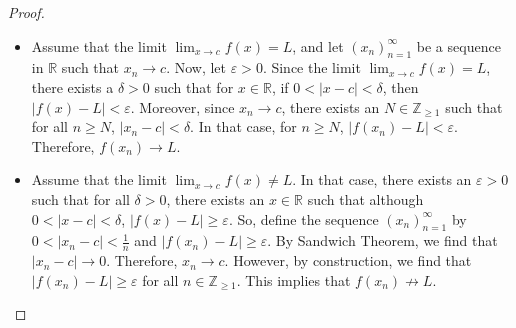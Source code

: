 \documentclass[a4paper, openany]{memoir}
\theoremstyle{definition}
\theoremstyle{plain}
\begin{document}
\begin{proof}
\hspace*{0pt}
\begin{itemize}
    \item Assume that the limit $\lim_{x \to c} f(x) = L$, and let  $(x_n)_{n=1}^{\infty}$ be a sequence in $\mathbb{R}$ such that $x_n \to c$. Now, let $\varepsilon > 0$. Since the limit $\lim_{x \to c} f(x) = L$, there exists a $\delta > 0$ such that for $x \in \mathbb{R}$, if $0 < |x - c| < \delta$, then $|f(x) - L| < \varepsilon$. Moreover, since $x_n \to c$, there exists an $N \in \mathbb{Z}_{\geqslant 1}$ such that for all $n \geqslant N$, $|x_n - c| < \delta$. In that case, for $n \geqslant N$, $|f(x_n) - L| < \varepsilon$. Therefore, $f(x_n) \to L$.
    
    \item Assume that the limit $\lim_{x \to c} f(x) \neq L$. In that case, there exists an $\varepsilon > 0$ such that for all $\delta > 0$, there exists an $x \in \mathbb{R}$ such that although $0 < |x - c| < \delta$, $|f(x) - L| \geqslant \varepsilon$. So, define the sequence $(x_n)_{n=1}^{\infty}$ by $0 < |x_n - c| < \frac{1}{n}$ and $|f(x_n) - L| \geqslant \varepsilon$. By Sandwich Theorem, we find that $|x_n - c| \to 0$. Therefore, $x_n \to c$. However, by construction, we find that $|f(x_n) - L| \geqslant \varepsilon$ for all $n \in \mathbb{Z}_{\geqslant 1}$. This implies that $f(x_n) \not\to L$.
\end{itemize}
\end{proof}
\end{document}
